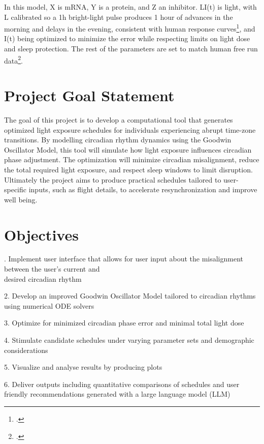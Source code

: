 \documentclass{article}
\begin{document}
In this model, X is mRNA, Y is a protein, and Z an inhibitor. LI(t) is light, with L calibrated so a 1h bright-light pulse produces 1 hour of advances in the morning and delays in the evening, consistent with human response curves\footcite{source6}, and I(t) being optimized to minimize the error while respecting limits on light dose and sleep protection. The rest of the parameters are set to match human free run data\footcite{source7}.

\section{Project Goal Statement}
\indent The goal of this project is to develop a computational tool that generates optimized light exposure schedules for individuals experiencing abrupt time-zone transitions. By modelling circadian rhythm dynamics using the Goodwin Oscillator Model, this tool will simulate how light exposure influences circadian phase adjustment. The optimization will minimize circadian misalignment, reduce the total required light exposure, and respect sleep windows to limit disruption. Ultimately the project aims to produce practical schedules tailored to user-specific inputs, such as flight details, to accelerate resynchronization and improve well being.

\section{Objectives}
. Implement user interface that allows for user input about the misalignment between the user’s current and \\
\indent\indent desired circadian rhythm

2. Develop an improved Goodwin Oscillator Model tailored to circadian rhythms using numerical ODE solvers 

3. Optimize for minimized circadian phase error and minimal total light dose

4. Stimulate candidate schedules under varying parameter sets and demographic considerations 

5. Visualize and analyse results by producing plots

6. Deliver outputs including quantitative comparisons of schedules and user friendly recommendations generated 
\indent\indent with a large language model (LLM)
\end{document}
